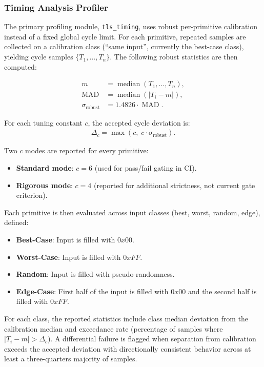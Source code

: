 \documentclass[titlepage]{report}
\begin{document}
	\subsubsection{Timing Analysis Profiler}
	The primary profiling module, \texttt{tls\_timing}, uses robust per-primitive calibration instead of a fixed global cycle limit. For each primitive, repeated samples are collected on a calibration class (``same input'', currently the best-case class), yielding cycle samples $\{T_1,\dots,T_n\}$. The following robust statistics are then computed:
	
	\begin{align*}
		m &= \operatorname{median}(T_1,\dots,T_n),\\
		\operatorname{MAD} &= \operatorname{median}\left(\left|T_i - m\right|\right),\\
		\sigma_{\text{robust}} &= 1.4826 \cdot \operatorname{MAD}.
	\end{align*}
	
	For each tuning constant $c$, the accepted cycle deviation is:
	\begin{align*}
		\Delta_c = \max\!\left(c,\; c\cdot \sigma_{\text{robust}}\right).
	\end{align*}
	
	Two $c$ modes are reported for every primitive:
	\begin{itemize}
		\item \textbf{Standard mode}: $c=6$ (used for pass/fail gating in CI).
		\item \textbf{Rigorous mode}: $c=4$ (reported for additional strictness, not current gate criterion).
	\end{itemize}
	
	Each primitive is then evaluated across input classes (best, worst, random, edge), defined:
	\begin{itemize}
		\item \textbf{Best-Case}: Input is filled with $0x00$.
		\item \textbf{Worst-Case}: Input is filled with $0xFF$.
		\item \textbf{Random}: Input is filled with pseudo-randomness.
		\item \textbf{Edge-Case}: First half of the input is filled with $0x00$ and the second half is filled with $0xFF$.
	\end{itemize}
	
	For each class, the reported statistics include class median deviation from the calibration median and exceedance rate (percentage of samples where $|T_i-m|>\Delta_c$). A differential failure is flagged when separation from calibration exceeds the accepted deviation with directionally consistent behavior across at least a three-quarters majority of samples.	
	
\end{document}
